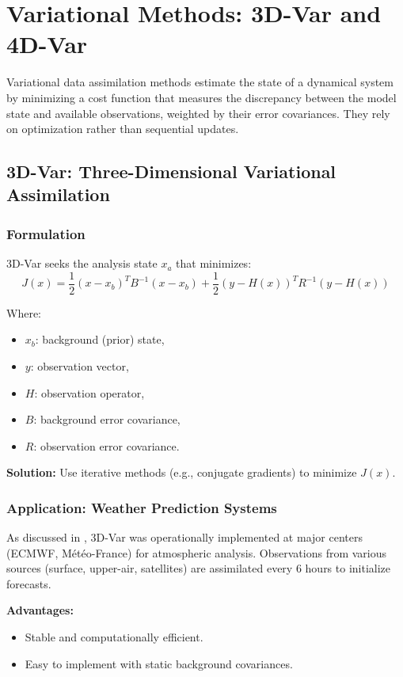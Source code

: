 \documentclass[a4paper]{article}
\begin{document}
\section{Variational Methods: 3D-Var and 4D-Var}

Variational data assimilation methods estimate the state of a dynamical system by minimizing a cost function that measures the discrepancy between the model state and available observations, weighted by their error covariances. They rely on optimization rather than sequential updates.

\subsection{3D-Var: Three-Dimensional Variational Assimilation}

\subsubsection*{Formulation}

3D-Var seeks the analysis state $x_a$ that minimizes:
\[
J(x) = \frac{1}{2}(x - x_b)^T B^{-1} (x - x_b) + \frac{1}{2}(y - H(x))^T R^{-1} (y - H(x))
\]

Where:
\begin{itemize}
  \item $x_b$: background (prior) state,
  \item $y$: observation vector,
  \item $H$: observation operator,
  \item $B$: background error covariance,
  \item $R$: observation error covariance.
\end{itemize}

\textbf{Solution:} Use iterative methods (e.g., conjugate gradients) to minimize $J(x)$.

\subsubsection*{Application: Weather Prediction Systems}

As discussed in \textcite{navon2009data}, 3D-Var was operationally implemented at major centers (ECMWF, Météo-France) for atmospheric analysis. Observations from various sources (surface, upper-air, satellites) are assimilated every 6 hours to initialize forecasts.

\textbf{Advantages:}
\begin{itemize}
  \item Stable and computationally efficient.
  \item Easy to implement with static background covariances.
\end{itemize}
\end{document}
